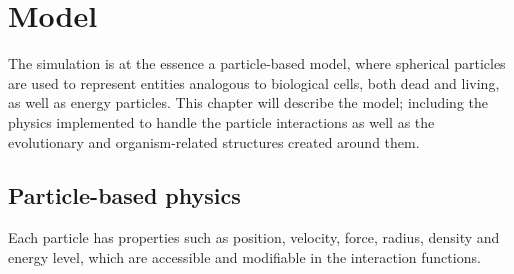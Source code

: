 \chapter{Model}
The simulation is at the essence a particle-based model, where spherical particles are used to represent entities analogous to biological cells, both dead and living, as well as energy particles. This chapter will describe the model; including the physics implemented to handle the particle interactions as well as the evolutionary and organism-related structures created around them.
\section{Particle-based physics}
Each particle has properties such as position, velocity, force, radius, density and energy level, which are accessible and modifiable in the interaction functions.

